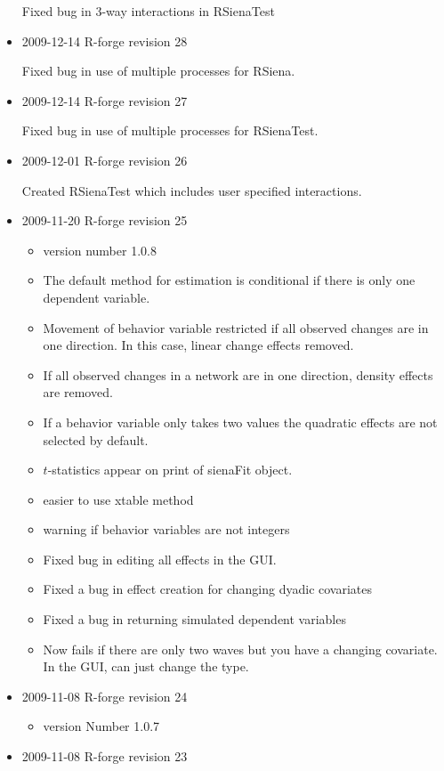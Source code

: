 \documentclass[a4paper,fleqn,11pt]{article}
\newcommand{\+}{\, + \,}
\newcommand{\sfn}[1]{\textsf{#1}}
\begin{document}
\begin{small}
\begin{itemize}
Fixed bug in 3-way interactions in \textsf{RSienaTest}

\item 2009-12-14 R-forge revision 28

 Fixed bug in use of multiple processes for RSiena.

\item 2009-12-14 R-forge revision 27

Fixed bug in use of multiple processes for
  \textsf{RSienaTest}.

\item 2009-12-01 R-forge revision 26

Created \textsf{RSienaTest} which includes user
  specified interactions.

\item 2009-11-20 R-forge revision 25

  \begin{itemize}
  \item  version number 1.0.8
  \item The default method for estimation is conditional if there is only one
    dependent variable.
  \item Movement of behavior variable restricted if all observed changes are in
    one direction. In this case, linear change effects removed.
  \item If all observed changes in a network are in one direction, density
    effects are removed.
  \item If a behavior variable only takes two values the quadratic effects
    are not selected by default.
  \item $t$-statistics appear on print of \sfn{sienaFit} object.
  \item easier to use \sfn{xtable} method
  \item warning if behavior variables are not integers
  \item Fixed bug in editing all effects in the GUI.
  \item Fixed a bug in effect creation for changing dyadic covariates
  \item Fixed a bug in returning simulated dependent variables
  \item Now fails if there are only two waves but you have a changing
    covariate. In the GUI, can just change the type.
  \end{itemize}

\item 2009-11-08 R-forge revision 24

  \begin{itemize}
  \item
    version Number 1.0.7
  \end{itemize}
\item  2009-11-08 R-forge revision 23


\end{itemize}
\end{small}
\end{document}
